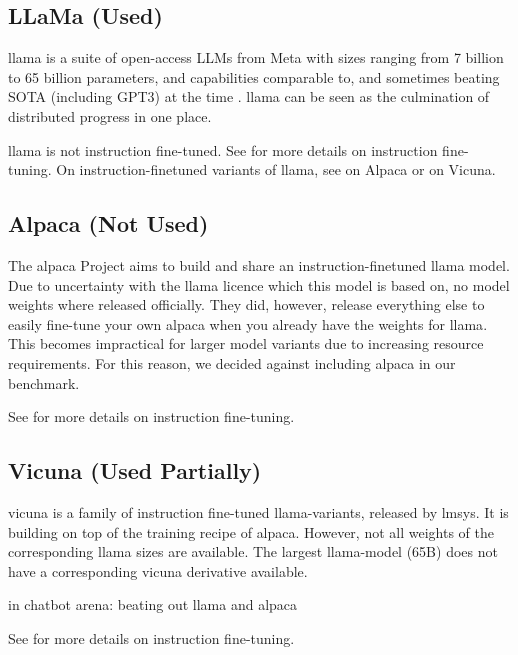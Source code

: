 \subsection{LLaMa (Used)}\label{sub:llama}
\gls{llama} is a suite of open-access \glspl{LLM} from \gls{Meta} with sizes ranging from 7 billion to 65 billion parameters, and capabilities comparable to, and sometimes beating \gls{SOTA} (including \gls{GPT3}) at the time \cite{touvron_llama_2023}. \gls{llama} can be seen as the culmination of distributed progress in one place.

\gls{llama} is not instruction fine-tuned. See  for more details on instruction fine-tuning.
On instruction-finetuned variants of \gls{llama}, see  on Alpaca or  on Vicuna.

\subsection{Alpaca (Not Used)}\label{sub:alpaca}
The \gls{alpaca} Project \cite{tatsulab_2023} aims to build and share an instruction-finetuned \gls{llama} model.
Due to uncertainty with the \gls{llama} licence which this model is based on, no model weights where released officially.
They did, however, release everything else to easily fine-tune your own \gls{alpaca} when you already have the weights for \gls{llama}.
This becomes impractical for larger model variants due to increasing resource requirements. For this reason, we decided against including \gls{alpaca} in our benchmark.

See  for more details on instruction fine-tuning.

\subsection{Vicuna (Used Partially)}\label{sub:vicuna}
\gls{vicuna} is a family of instruction fine-tuned \gls{llama}-variants, released by \gls{lmsys}. It is building on top of the training recipe of \gls{alpaca}.
However, not all weights of the corresponding \gls{llama} sizes are available.
The largest \gls{llama}-model (65B) does not have a corresponding \gls{vicuna} derivative available.

in chatbot arena: beating out \gls{llama} and \gls{alpaca} \cite{zheng_judging_2023}

See  for more details on instruction fine-tuning.

